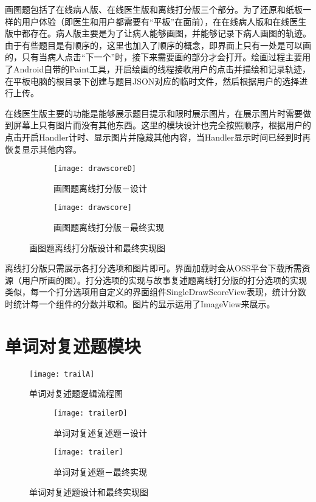 画图题包括了在线病人版、在线医生版和离线打分版三个部分。为了还原和纸板一样的用户体验（即医生和用户都需要有“平板”在面前），在在线病人版和在线医生版中都存在。病人版主要是为了让病人能够画图，并能够记录下病人画图的轨迹。由于有些题目是有顺序的，这里也加入了顺序的概念，即界面上只有一处是可以画的，只有当病人点击“下一个”时，接下来需要画的部分才会打开。绘画过程主要用了Android自带的Paint工具，开启绘画的线程接收用户的点击并描绘和记录轨迹，在平板电脑的根目录下创建与题目JSON对应的临时文件，然后根据用户的选择进行上传。

在线医生版主要的功能是能够展示题目提示和限时展示图片，在展示图片时需要做到屏幕上只有图片而没有其他东西。这里的模块设计也完全按照顺序，根据用户的点击开启Handler计时、显示图片并隐藏其他内容，当Handler显示时间已经到时再恢复显示其他内容。

\begin{figure}[h]
\centering%
\begin{subfigure}{6cm}
\texttt{[image: drawscoreD]}
\caption{画图题离线打分版－设计}
\end{subfigure}
\hspace{4em}%
\begin{subfigure}{6cm}
\texttt{[image: drawscore]}
\caption{画图题离线打分版－最终实现}
\end{subfigure}
\caption{画图题离线打分版设计和最终实现图}
\label{fig:big1-subfigure}
\end{figure}

离线打分版只需展示各打分选项和图片即可。界面加载时会从OSS平台下载所需资源（用户所画的图）。打分选项的实现与故事复述题离线打分版的打分选项的实现类似，每一个打分选项用自定义的界面组件SingleDrawScoreView表现，统计分数时统计每一个组件的分数并取和。图片的显示运用了ImageView来展示。

\section{单词对复述题模块}

\begin{figure}[h]
\centering%
\texttt{[image: trailA]}
\caption{单词对复述题逻辑流程图}
\label{fig:big1-subfigure}
\end{figure}

\begin{figure}[h]
\centering%
\begin{subfigure}{6cm}
\texttt{[image: trailerD]}
\caption{单词对复述复述题－设计}
\end{subfigure}
\hspace{4em}%
\begin{subfigure}{6cm}
\texttt{[image: trailer]}
\caption{单词对复述题－最终实现}
\end{subfigure}
\caption{单词对复述题设计和最终实现图}
\label{fig:big1-subfigure}
\end{figure}

